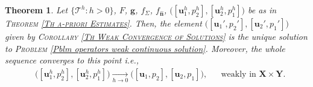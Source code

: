\documentclass[3p]{elsarticle}
\newtheorem{theorem}{Theorem}
\def\X{\mathbf X}
\def\Y{\mathbf Y}
\def\g{\mathbf g}
\def\uone{\mathbf{u}_{1}}
\def\uoneh{\mathbf{u}_{1}^{h}}
\def\utwo{\mathbf{u}_{2}}
\def\utwoh{\mathbf{u}_{2}^{h}}
\def\pone{p_{1}}
\def\poneh{p_{1}^{h}}
\def\ptwo{p_{2}}
\def\ptwoh{p_{2}^{h}}
\def\flux{f_{\bm{\hat{n}} } }
\def\stress{f_{\Sigma } }
\def\triang{\mathcal{T}}
\begin{document}
%
%
\begin{theorem}\label{Th Convergence of the Solutions}
Let $\{\triang^{h}: h>0\}$, $F$, $\g$, $\stress$, $\flux$, $\big([\uoneh, \ptwoh],[\utwoh, \poneh]\big)$ be as in \textsc{Theorem \ref{Th a-priori Estimates}}. Then, the element $\big([\uone', \ptwo'],[\utwo', \pone']\big) $ given by \textsc{Corollary \ref{Th Weak Convergence of Solutions}} is the unique solution to \textsc{Problem} \eqref{Pblm operators weak continuous solution}. Moreover, the whole sequence converges to this point i.e., 
%
\begin{align}\label{Stmt Global Weak Convergence}
& \big([\uoneh, \ptwoh],[\utwoh, \poneh]\big)\xrightarrow[h\rightarrow 0]{} 
\big([\uone, \ptwo],[\utwo, \pone]\big) ,&
& \text{weakly in } \X\times \Y.
\end{align}
%
\end{theorem}
%
\end{document}
